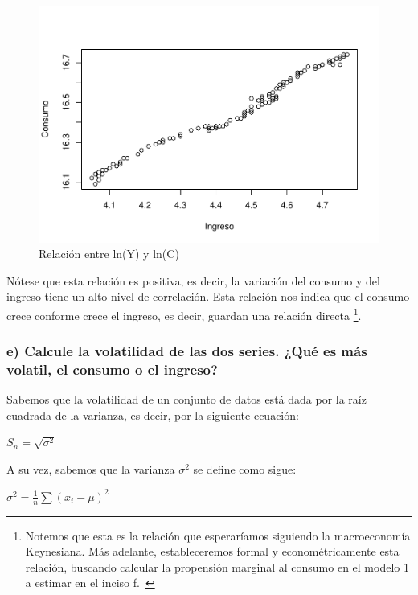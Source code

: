 \documentclass[
]{article}
\begin{document}
\begin{figure}
\centering
\includegraphics{Ejercicio-3_files/figure-latex/unnamed-chunk-10-1.pdf}
\caption{Relación entre ln(Y) y ln(C)}
\end{figure}

Nótese que esta relación es positiva, es decir, la variación del consumo
y del ingreso tiene un alto nivel de correlación. Esta relación nos
indica que el consumo crece conforme crece el ingreso, es decir, guardan
una relación directa \footnote{Notemos que esta es la relación que
  esperaríamos siguiendo la macroeconomía Keynesiana. Más adelante,
  estableceremos formal y econométricamente esta relación, buscando
  calcular la propensión marginal al consumo en el modelo 1 a estimar en
  el inciso f.~}.

\hypertarget{e-calcule-la-volatilidad-de-las-dos-series.-quuxe9-es-muxe1s-volatil-el-consumo-o-el-ingreso}{%
\subsubsection{e) Calcule la volatilidad de las dos series. ¿Qué es más
volatil, el consumo o el
ingreso?}\label{e-calcule-la-volatilidad-de-las-dos-series.-quuxe9-es-muxe1s-volatil-el-consumo-o-el-ingreso}}

Sabemos que la volatilidad de un conjunto de datos está dada por la raíz
cuadrada de la varianza, es decir, por la siguiente ecuación:

\(S_n=\sqrt{\sigma^2}\)

A su vez, sabemos que la varianza \(\sigma^2\) se define como sigue:

\(\sigma^2=\frac{1}{n}\sum(x_i-\mu)^2\)
\end{document}
